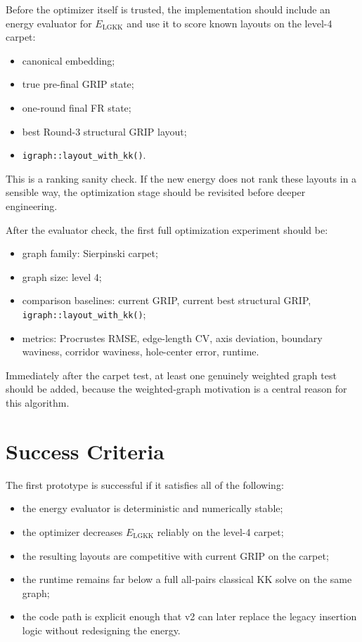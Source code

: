 \documentclass[11pt]{article}
\newcommand{\code}[1]{\begingroup\urlstyle{tt}\nolinkurl{#1}\endgroup}
\begin{document}
Before the optimizer itself is trusted, the implementation should include an
energy evaluator for $E_{\mathrm{LGKK}}$ and use it to score known layouts on
the level-4 carpet:
\begin{itemize}[leftmargin=1.4em]
  \item canonical embedding;
  \item true pre-final GRIP state;
  \item one-round final FR state;
  \item best Round-3 structural GRIP layout;
  \item \code{igraph::layout\_with\_kk()}.
\end{itemize}

This is a ranking sanity check. If the new energy does not rank these layouts
in a sensible way, the optimization stage should be revisited before deeper
engineering.

After the evaluator check, the first full optimization experiment should be:
\begin{itemize}[leftmargin=1.4em]
  \item graph family: Sierpinski carpet;
  \item graph size: level 4;
  \item comparison baselines: current GRIP, current best structural GRIP,
    \code{igraph::layout\_with\_kk()};
  \item metrics: Procrustes RMSE, edge-length CV, axis deviation, boundary
    waviness, corridor waviness, hole-center error, runtime.
\end{itemize}

Immediately after the carpet test, at least one genuinely weighted graph test
should be added, because the weighted-graph motivation is a central reason for
this algorithm.

\section{Success Criteria}

The first prototype is successful if it satisfies all of the following:
\begin{itemize}[leftmargin=1.4em]
  \item the energy evaluator is deterministic and numerically stable;
  \item the optimizer decreases $E_{\mathrm{LGKK}}$ reliably on the level-4
    carpet;
  \item the resulting layouts are competitive with current GRIP on the carpet;
  \item the runtime remains far below a full all-pairs classical KK solve on
    the same graph;
  \item the code path is explicit enough that v2 can later replace the legacy
    insertion logic without redesigning the energy.
\end{itemize}
\end{document}
